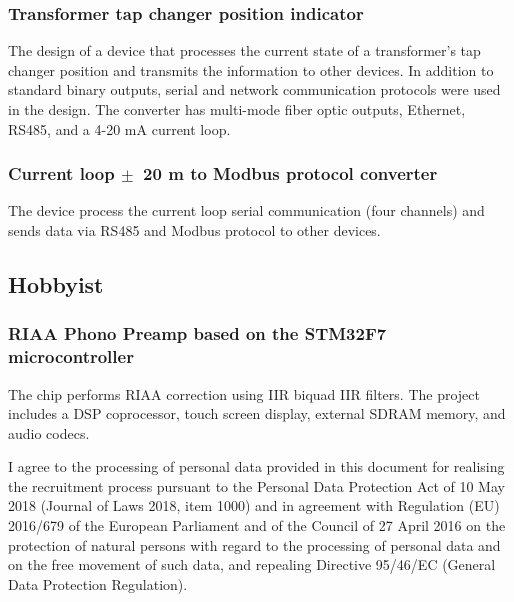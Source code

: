 \documentclass[letterpaper]{template/twentysecondcv_en} %
\begin{document}
\subsubsection*{Transformer tap changer position indicator}
The design of a device that processes the current state of a transformer's tap changer position and transmits the information to other devices. In addition to standard binary outputs, serial and network communication protocols were used in the design. The converter has multi-mode fiber optic outputs, Ethernet, RS485, and a 4-20 mA current loop.

\subsubsection*{Current loop $\pm$~20 m to Modbus protocol converter}
The device process the current loop serial communication (four channels) and sends data via RS485 and Modbus protocol to other devices.


\subsection{Hobbyist}
\vspace{-0.25cm}
\subsubsection*{RIAA Phono Preamp based on the STM32F7 microcontroller}
The chip performs RIAA correction using IIR biquad IIR filters. The project includes a DSP coprocessor, touch screen display, external SDRAM memory, and audio codecs.



%

\vspace{0.9cm}
\tiny{I agree to the processing of personal data provided in this document for realising the recruitment process pursuant to the Personal Data Protection Act of 10 May 2018 (Journal of Laws 2018, item 1000) and in agreement with Regulation (EU) 2016/679 of the European Parliament and of the Council of 27 April 2016 on the protection of natural persons with regard to the processing of personal data and on the free movement of such data, and repealing Directive 95/46/EC (General Data Protection Regulation).}
\end{document}

